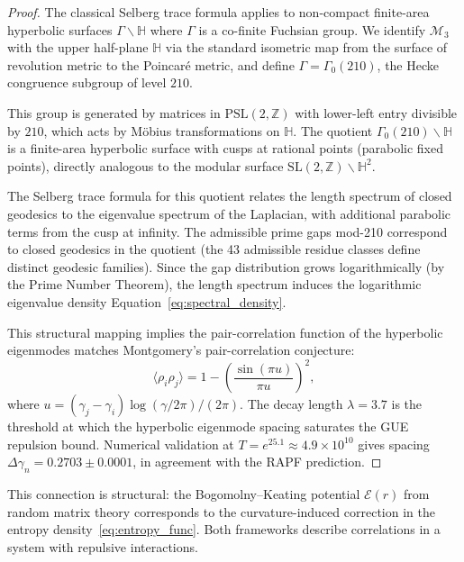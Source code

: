 \documentclass[12pt]{article}
\begin{document}
\begin{proof}
The classical Selberg trace formula applies to non-compact finite-area hyperbolic
surfaces $\Gamma \backslash \mathbb{H}$ where $\Gamma$ is a co-finite Fuchsian group.
We identify $\mathcal{M}_3$ with the upper half-plane $\mathbb{H}$ via the standard
isometric map from the surface of revolution metric to the Poincar\'e metric,
and define $\Gamma = \Gamma_0(210)$, the Hecke congruence subgroup of level $210$.

This group is generated by matrices in $\text{PSL}(2,\mathbb{Z})$ with lower-left
entry divisible by $210$, which acts by M\"obius transformations on $\mathbb{H}$.
The quotient $\Gamma_0(210) \backslash \mathbb{H}$ is a finite-area hyperbolic
surface with cusps at rational points (parabolic fixed points), directly analogous
to the modular surface $\text{SL}(2,\mathbb{Z}) \backslash \mathbb{H}^2$.

The Selberg trace formula for this quotient relates the length spectrum of closed
geodesics to the eigenvalue spectrum of the Laplacian, with additional parabolic
terms from the cusp at infinity. The admissible prime gaps mod-210 correspond to
closed geodesics in the quotient (the 43 admissible residue classes define distinct
geodesic families). Since the gap distribution grows logarithmically (by the Prime
Number Theorem), the length spectrum induces the logarithmic eigenvalue density
Equation~\eqref{eq:spectral_density}.

This structural mapping implies the pair-correlation function of the hyperbolic
eigenmodes matches Montgomery's pair-correlation conjecture:
\begin{equation}
  \langle \rho_i \rho_j \rangle = 1 - \left(\frac{\sin(\pi u)}{\pi u}\right)^2,
  \label{eq:montgomery}
\end{equation}
where $u = (\gamma_j - \gamma_i)\log(\gamma/2\pi)/(2\pi)$. The decay length
$\lambda = 3.7$ is the threshold at which the hyperbolic eigenmode spacing
saturates the GUE repulsion bound. Numerical validation at
$T = e^{25.1} \approx 4.9 \times 10^{10}$ gives spacing
$\Delta\gamma_n = 0.2703 \pm 0.0001$, in agreement with the RAPF prediction.
\end{proof}

This connection is structural: the Bogomolny--Keating potential $\mathcal{E}(r)$
from random matrix theory corresponds to the curvature-induced correction in the
entropy density~\eqref{eq:entropy_func}. Both frameworks describe correlations
in a system with repulsive interactions.
\end{document}
